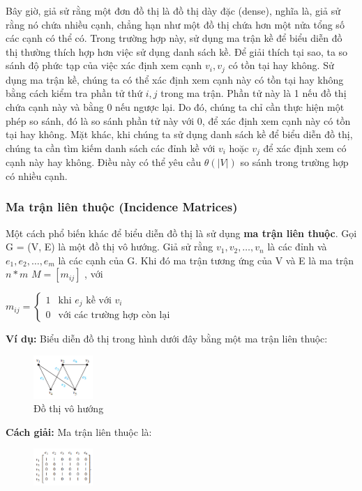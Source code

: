 Bây giờ, giả sử rằng một đơn đồ thị là đồ thị dày đặc (dense), nghĩa là, giả sử rằng nó chứa nhiều cạnh, chẳng hạn như một đồ thị chứa hơn một nửa tổng số các cạnh có thể có. Trong trường hợp này, sử dụng ma trận kề để biểu diễn đồ thị thường thích hợp hơn việc sử dụng danh sách kề. Để giải thích tại sao, ta so sánh độ phức tạp của việc xác định xem cạnh ${v_i, v_j}$ có tồn tại hay không. Sử dụng ma trận kề, chúng ta có thể xác định xem cạnh này có tồn tại hay không bằng cách kiểm tra phần tử thứ ${i,j}$ trong ma trận. Phần tử này là 1 nếu đồ thị chứa cạnh này và bằng 0 nếu ngược lại. Do đó, chúng ta chỉ cần thực hiện một phép so sánh, đó là so sánh phần tử này với 0, để xác định xem cạnh này có tồn tại hay không. Mặt khác, khi chúng ta sử dụng danh sách kề để biểu diễn đồ thị, chúng ta cần tìm kiếm danh sách các đỉnh kề với $v_i$ hoặc $v_j$ để xác định xem có cạnh này hay không. Điều này có thể yêu cầu $\theta(|V|)$ so sánh trong trường hợp có nhiều cạnh.


\subsubsection{Ma trận liên thuộc (Incidence Matrices)}
Một cách phổ biến khác để biểu diễn đồ thị là sử dụng \textbf{ma trận liên thuộc}. Gọi G = (V, E) là một đồ thị vô hướng. Giả sử rằng $v_1, v_2,…, v_n$ là các đỉnh và $e_1, e_2,…, e_m$ là các cạnh của G. Khi đó ma trận tương ứng của V và E là ma trận $n*m$ $M = [m_{ij}]$ , với

$
m_{ij} = \left\{ \begin{array}{lcr}
1 & \text{khi $e_j$ kề với $v_i$}\\
0 & \text{với các trường hợp còn lại}
\end{array} \right.
$

\textbf{Ví dụ:}
Biểu diễn đồ thị trong hình dưới đây bằng một ma trận liên thuộc:

\begin{figure}[H]    
    \centering %
    \includegraphics[width=0.2\textwidth]{assets/pic4.png}
    \caption{Đồ thị vô hướng}
\end{figure}


\textbf{Cách giải:} Ma trận liên thuộc là:

\begin{figure}[H]    
    \centering %
    \includegraphics[width=0.2\textwidth]{assets/pic5.png}
\end{figure}

